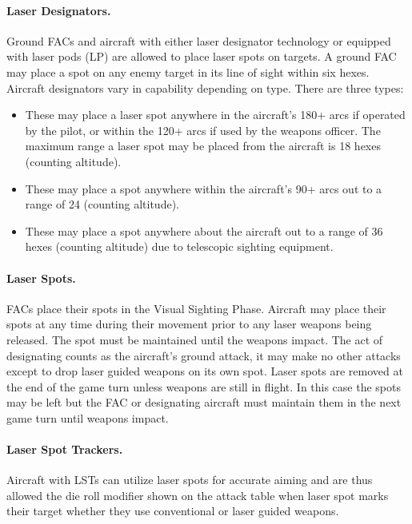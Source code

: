 \paragraph{Laser Designators.} Ground FACs and aircraft with either laser designator technology or equipped with laser pods (LP) are allowed to place laser spots on targets. A ground FAC may place a spot on any enemy target in its line of sight within six hexes. Aircraft designators vary in capability depending on type. There are three types:

\begin{itemize}

    \item{} These may place a laser spot anywhere in the aircraft's 180+ arcs if operated by the pilot, or within the 120+ arcs if used by the weapons officer. The maximum range a laser spot may be placed from the aircraft is 18 hexes (counting altitude).

    \item{} These may place a spot anywhere within the aircraft's 90+ arcs out to a range of 24 (counting altitude).

    \item{} These may place a spot anywhere about the aircraft out to a range of 36 hexes (counting altitude) due to telescopic sighting equipment.

\end{itemize}


\paragraph{Laser Spots.} 
\label{rule:laser-spots}
FACs place their spots in the Visual Sighting Phase. Aircraft may place their spots at any time during their movement prior to any laser weapons being released. The spot must be maintained until the weapons impact. The act of designating counts as the aircraft's ground attack, it may make no other attacks except to drop laser guided weapons on its own spot. Laser spots are removed at the end of the game turn unless weapons are still in flight. In this case the spots may be left but the FAC or designating aircraft must maintain them in the next game turn until weapons impact.

\paragraph{Laser Spot Trackers.} Aircraft with LSTs can utilize laser spots for accurate aiming and are thus allowed the die roll modifier shown on the attack table when laser spot marks their target whether they use conventional or laser guided weapons.  

